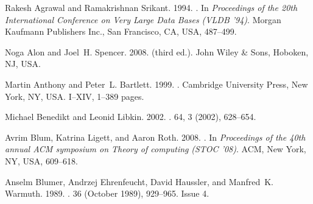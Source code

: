 \begin{thebibliography}{00}
{Rakesh Agrawal} {and} {Ramakrishnan Srikant}. 1994.
\newblock {}. In {\em Proceedings of the 20th International Conference on
  Very Large Data Bases} {\em (VLDB '94)}. Morgan Kaufmann Publishers Inc., San
  Francisco, CA, USA, 487--499.


{Noga Alon} {and} {Joel~H. Spencer}. 2008.
 (third ed.).
\newblock John Wiley {\&} Sons, Hoboken, NJ, USA.


{Martin Anthony} {and} {Peter~L. Bartlett}. 1999.
.
\newblock Cambridge University Press, New York, NY, USA. I--XIV, 1--389 pages.


{Michael Benedikt} {and} {Leonid Libkin}. 2002.
\newblock {}.
 {64}, 3 (2002), 628--654.


{Avrim Blum}, {Katrina Ligett}, {and} {Aaron Roth}. 2008.
\newblock {}. In {\em Proceedings of the 40th annual ACM symposium on
  Theory of computing} {\em (STOC '08)}. ACM, New York, NY, USA, 609--618.


{Anselm Blumer}, {Andrzej Ehrenfeucht}, {David Haussler}, {and} {Manfred~K.
  Warmuth}. 1989.
\newblock {}.
  {36} (October 1989), 929--965.
\newblock
Issue 4.



\end{thebibliography}
